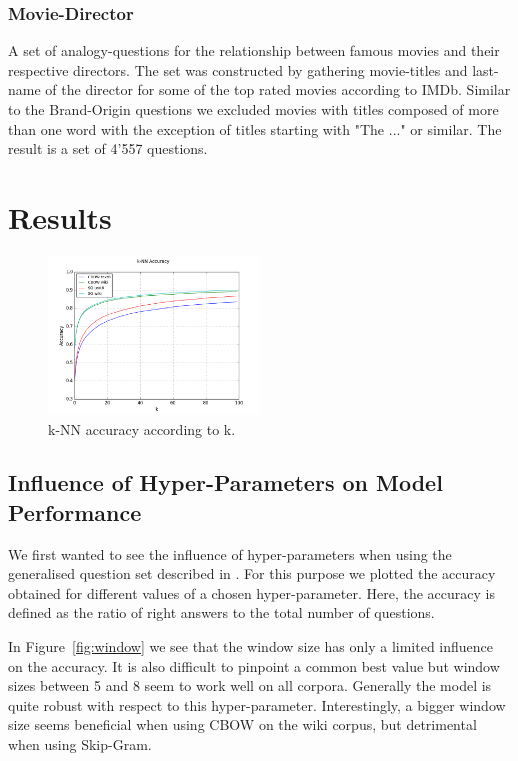 \documentclass[conference]{IEEEtran}
\begin{document}
\subsubsection{Movie-Director}
A set of analogy-questions for the relationship between famous movies and their respective 
directors. The set was constructed by gathering movie-titles and last-name of the director for 
some of the top rated movies according to IMDb. Similar to the Brand-Origin questions we 
excluded movies with titles composed of more than one word with the exception of titles
starting with "The ..." or similar.  The result is a set of 4'557 questions.


\section{Results}
\label{sec:res}

\begin{figure}[t]
\centering
\includegraphics[width=0.5\textwidth]{graph_knn-acc}
\caption{k-NN accuracy according to k.}
\label{fig:knn}
\end{figure}


\subsection{Influence of Hyper-Parameters on Model Performance}
We first wanted to see the influence of hyper-parameters when using the generalised question set described in \cite{mikolov2013efficient}.
For this purpose we plotted the accuracy obtained for different values of a chosen hyper-parameter.
Here, the accuracy is defined as the ratio of right answers to the total number of questions.

In Figure~\ref{fig:window} we see that the window size has only a limited influence on the accuracy.
It is also difficult to pinpoint a common best value but window sizes between 5 and 8 seem to work well on all corpora. 
Generally the model is quite robust with respect to this hyper-parameter.
Interestingly, a bigger window size seems beneficial when using CBOW on the wiki corpus, but detrimental when using Skip-Gram.
\end{document}
